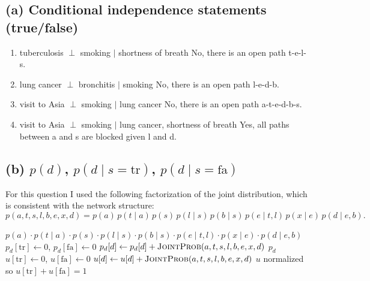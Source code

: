 \documentclass[11pt]{article}
\begin{document}
\subsection*{(a) Conditional independence statements (true/false)}
\begin{enumerate}
  \item tuberculosis $\perp$ smoking $\mid$ shortness of breath \quad No, there is an open path t-e-l-s.
  \item lung cancer $\perp$ bronchitis $\mid$ smoking \quad No, there is an open path l-e-d-b.
  \item visit to Asia $\perp$ smoking $\mid$ lung cancer \quad No, there is an open path a-t-e-d-b-s.
  \item visit to Asia $\perp$ smoking $\mid$ lung cancer, shortness of breath \quad Yes, all paths between a and s are blocked given l and d.
\end{enumerate}

\subsection*{(b) $p(d)$, $p(d\mid s=\mathrm{tr})$, $p(d\mid s=\mathrm{fa})$}

For this question I used the following factorization of the joint distribution, which is consistent with the network structure:
\[
  p(a,t,s,l,b,e,x,d) = p(a)\,p(t\mid a)\,p(s)\,p(l\mid s)\,p(b\mid s)\,p(e\mid t,l)\,p(x\mid e)\,p(d\mid e,b).
\]


\begin{algorithm}
\caption{Marginal and conditional queries on the Chest Clinic network}
\begin{algorithmic}[1]
  \State \Return $p(a)\cdot p(t\mid a)\cdot p(s)\cdot p(l\mid s)\cdot p(b\mid s)\cdot p(e\mid t,l)\cdot p(x\mid e)\cdot p(d\mid e,b)$
\EndProcedure
{}
  \State $p_d[\mathrm{tr}] \gets 0$, \quad $p_d[\mathrm{fa}] \gets 0$
    \State $p_d[d] \gets p_d[d] + \Call{JointProb}{a,t,s,l,b,e,x,d}$
  \EndFor
  \State \Return $p_d$
\EndProcedure
{}
  \State $u[\mathrm{tr}] \gets 0$, \quad $u[\mathrm{fa}] \gets 0$
    \State $u[d] \gets u[d] + \Call{JointProb}{a,t,s,l,b,e,x,d}$
  \EndFor
  \State \Return $u$ normalized so $u[\mathrm{tr}] + u[\mathrm{fa}] = 1$
\EndProcedure
\end{algorithmic}
\end{algorithm}
\end{document}
